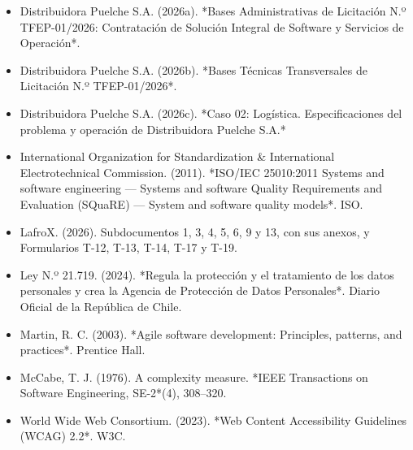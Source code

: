 \begin{itemize}
\item Distribuidora Puelche S.A. (2026a). *Bases Administrativas de Licitación N.º TFEP-01/2026: Contratación de Solución Integral de Software y Servicios de Operación*.
\item Distribuidora Puelche S.A. (2026b). *Bases Técnicas Transversales de Licitación N.º TFEP-01/2026*.
\item Distribuidora Puelche S.A. (2026c). *Caso 02: Logística. Especificaciones del problema y operación de Distribuidora Puelche S.A.*
\item International Organization for Standardization \& International Electrotechnical Commission. (2011). *ISO/IEC 25010:2011 Systems and software engineering — Systems and software Quality Requirements and Evaluation (SQuaRE) — System and software quality models*. ISO.
\item LafroX. (2026). Subdocumentos 1, 3, 4, 5, 6, 9 y 13, con sus anexos, y Formularios T-12, T-13, T-14, T-17 y T-19.
\item Ley N.º 21.719. (2024). *Regula la protección y el tratamiento de los datos personales y crea la Agencia de Protección de Datos Personales*. Diario Oficial de la República de Chile.
\item Martin, R. C. (2003). *Agile software development: Principles, patterns, and practices*. Prentice Hall.
\item McCabe, T. J. (1976). A complexity measure. *IEEE Transactions on Software Engineering, SE-2*(4), 308–320.
\item World Wide Web Consortium. (2023). *Web Content Accessibility Guidelines (WCAG) 2.2*. W3C.
\end{itemize}

